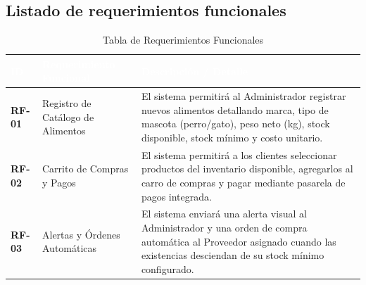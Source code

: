 \documentclass[11pt,a4paper]{article}
\begin{document}
\subsection{Listado de requerimientos funcionales}
\begin{table}[H]
    \centering
    \small
    \renewcommand{\arraystretch}{1.4}
    \begin{tabularx}{\textwidth}{|l|p{4.5cm}|L|}
        \hline
         \textcolor{white}{\textbf{ID}} & \textcolor{white}{\textbf{Requerimiento Funcional}} & \textcolor{white}{\textbf{Descripción / Detalle}} \\
        \hline
        \textbf{RF-01} & Registro de Catálogo de Alimentos & El sistema permitirá al Administrador registrar nuevos alimentos detallando marca, tipo de mascota (perro/gato), peso neto (kg), stock disponible, stock mínimo y costo unitario. \\
        \hline
        \textbf{RF-02} & Carrito de Compras y Pagos & El sistema permitirá a los clientes seleccionar productos del inventario disponible, agregarlos al carro de compras y pagar mediante pasarela de pagos integrada. \\
        \hline
        \textbf{RF-03} & Alertas y Órdenes Automáticas & El sistema enviará una alerta visual al Administrador y una orden de compra automática al Proveedor asignado cuando las existencias desciendan de su stock mínimo configurado. \\
        \hline
    \end{tabularx}
    \caption{Tabla de Requerimientos Funcionales}
    \label{tab:requerimientos_funcionales}
\end{table}
\end{document}
